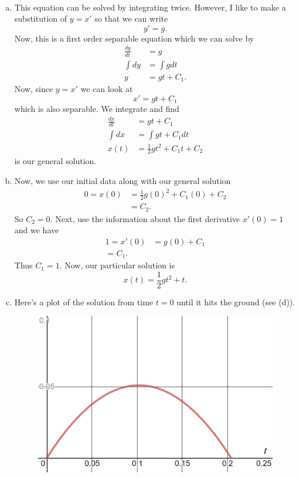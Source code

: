 \documentclass[12pt]{article} %
\begin{document}
\begin{solution}~
\begin{enumerate}[(a)]
    \item This equation can be solved by integrating twice.  However, I like to make a substitution of $y=x'$ so that we can write
    \[
    y'=g.
    \]
    Now, this is a first order separable equation which we can solve by
    \begin{align*}
        \frac{dy}{dt}&=g\\
        \int dy&= \int gdt\\
        y&= gt+C_1.
    \end{align*}
    Now, since $y=x'$ we can look at
    \[
    x'=gt+C_1
    \]
    which is also separable.  We integrate and find
    \begin{align*}
        \frac{dx}{dt}&=gt+C_1\\
        \int dx &= \int gt+C_1 dt\\
        x(t)&= \frac{1}{2}gt^2+C_1t+C_2
    \end{align*}
    is our general solution.
    \item Now, we use our initial data along with our general solution
    \begin{align*}
        0=x(0)&=\frac{1}{2}g(0)^2+C_1(0)+C_2\\
        &=C_2.
    \end{align*}
    So $C_2=0$. Next, use the information about the first derivative $x'(0)=1$ and we have
    \begin{align*}
        1=x'(0)&=g(0)+C_1\\
        =C_1.
    \end{align*}
    Thus $C_1=1$. Now, our particular solution is
    \[
    \boxed{x(t)=\frac{1}{2}gt^2+t.}
    \]
    \item Here's a plot of the solution from time $t=0$ until it hits the ground (see (d)).
    \begin{figure}[H]
        \centering
        \includegraphics[width=\textwidth]{projectile.png}

\end{figure}
\end{enumerate}
\end{solution}
\end{document}
